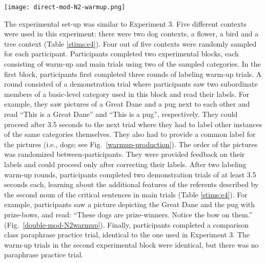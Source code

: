 \begin{figure*}[t]
	\begin{center}
		\texttt{[image: direct-mod-N2-warmup.png]}
	\end{center}
	\vspace{-0.3cm}
	\caption{Experiment 4 feature demonstration trial: Participants learn about additional features of the referents used on one critical main trial. For the dog-context participants learn that the pug and the Great Dane are prize-winners, indicated by bows on them.}
	\label{double-mod-N2warmup}
\end{figure*} 
The experimental set-up was similar to Experiment 3. Five different contexts were used in this experiment: there were two dog contexts, a flower, a bird and a tree context (Table \ref{stims:e4}). Four out of five contexts were randomly sampled for each participant.  Participants completed two experimental blocks, each consisting of warm-up and main trials using two of the sampled categories. In the first block, participants first completed three rounds of labeling warm-up trials. A round consisted of a demonstration trial where participants saw two subordinate members of a basic-level category used in this block and read their labels. For example, they saw pictures of a Great Dane and a pug next to each other and read “This is a Great Dane” and “This is a pug”, respectively. They could proceed after 3.5 seconds to the next trial where they had to label other instances of the same categories themselves. They also had to provide a common label for the pictures (i.e., dogs; see Fig.~\ref{warmup-production}). The order of the pictures was randomized between-participants. They were provided feedback on their labels and could proceed only after correcting their labels.  After two labeling warm-up rounds, participants completed two demonstration trials of at least 3.5 seconds each, learning about the additional features of the referents described by the second noun of the critical sentences in main trials (Table \ref{stims:e4}). For example, participants saw a picture depicting the Great Dane and the pug with prize-bows, and read: “These dogs are prize-winners. Notice the bow on them.” (Fig.~\ref{double-mod-N2warmup}). Finally, participants completed a comparison class paraphrase practice trial, identical to the one used in Experiment 3. The warm-up trials in the second experimental block were identical, but there was no paraphrase practice trial.  

